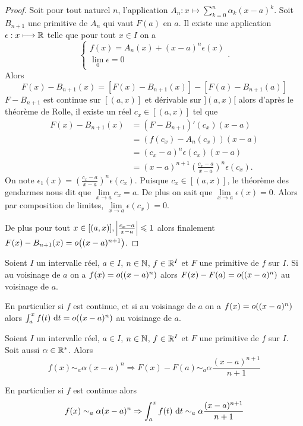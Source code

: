 \begin{proof}
  Soit pour tout naturel $n$, l'application $A_n : x \longmapsto \sum_{k=0}^n \alpha_k(x-a)^k$. Soit $B_{n+1}$ une primitive de $A_n$ qui vaut $F(a)$ en $a$. Il existe une application $\epsilon: x \longmapsto \mathbb{R}$ telle que pour tout $x \in I$ on a
  \begin{equation}
    \begin{cases}
      f(x) = A_n(x)+(x-a)^n\epsilon(x) \\
      \lim\limits_{0} \epsilon = 0
    \end{cases}.
  \end{equation}
  Alors
  \begin{equation}
    F(x) - B_{n+1}(x) = [F(x)-B_{n+1}(x)] - [F(a)-B_{n+1}(a)]
  \end{equation}
  $F-B_{n+1}$ est continue sur $[(a,x)]$ et dérivable sur $](a,x)[$ alors d'après le théorème de Rolle, il existe un réel $c_x \in [(a,x)]$ tel que
  \begin{align}
    F(x)-B_{n+1}(x) &= (F-B_{n+1})'(c_x)(x-a)\\
    & = (f(c_x)-A_n(c_x))(x-a)\\
    &=(c_x-a)^n\epsilon(c_x)(x-a)\\
    &=(x-a)^{n+1} \left(\frac{c_x-a}{x-a}\right)^n \epsilon(c_x).
  \end{align}
  On note $\epsilon_1(x)=\left(\frac{c_x-a}{x-a}\right)^n \epsilon(c_x)$. Puisque $c_x \in [(a,x)]$, le théorème des gendarmes nous dit que $\lim\limits_{x \to a} c_x =a$. De plus on sait que $\lim\limits_{x \to a}\epsilon(x)=0$. Alors par composition de limites, $\lim\limits_{x \to a} \epsilon(c_x)=0$. 

De plus pour tout $x \in [(a,x)], \left\lvert\frac{c_x-a}{x-a}\right\rvert \leqslant 1$ alors finalement $F(x)-B_{n+1}(x) = o\mathopen{}\left((x-a)^{n+1}\right)$.
\end{proof}

\begin{corth}
  Soient $I$ un intervalle réel, $a \in I$, $n \in \mathbb{N}$, $f \in \mathbb{R}^I$ et $F$ une primitive de $f$ sur $I$. Si au voisinage de $a$ on a $f(x)=o\mathopen{}\left((x-a)^n\right)$ alors $F(x)-F(a)=o\mathopen{}\left((x-a)^n\right)$ au voisinage de $a$. 

  En particulier si $f$ est continue, et si au voisinage de $a$ on a  $f(x)=o\mathopen{}\left((x-a)^n\right)$ alors $\int_a^x f(t)\,\mathop{}\mathopen{}\mathrm{d} t=o\mathopen{}\left((x-a)^n\right)$ au voisinage de $a$. 
\end{corth}

\begin{corth}
  Soient $I$ un intervalle réel, $a \in I$, $n \in \mathbb{N}$, $f \in \mathbb{R}^I$ et $F$ une primitive de $f$ sur $I$. Soit aussi $\alpha \in \mathbb{R}^{*}$. Alors
  \begin{equation}
    f(x) \sim_a \alpha(x-a)^n \Rightarrow F(x)-F(a) \sim_a \alpha \frac{(x-a)^{n+1}}{n+1}
  \end{equation}

  En particulier si $f$ est continue alors
  \begin{equation}
    f(x) \sim_a \alpha(x-a)^n \Rightarrow \int_a^x f(t)\,\mathop{}\mathopen{}\mathrm{d} t \sim_a \alpha \frac{(x-a)^{n+1}}{n+1}
  \end{equation}
\end{corth}

